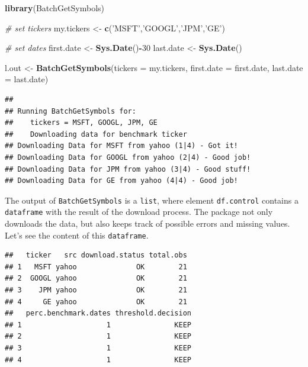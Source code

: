 \documentclass[11pt,]{book}
\newenvironment{Shaded}{\begin{snugshade}}{\end{snugshade}}
\newcommand{\KeywordTok}[1]{\textcolor[rgb]{0.27,0.27,0.27}{\textbf{#1}}}
\newcommand{\DataTypeTok}[1]{\textcolor[rgb]{0.27,0.27,0.27}{#1}}
\newcommand{\DecValTok}[1]{\textcolor[rgb]{0.06,0.06,0.06}{#1}}
\newcommand{\StringTok}[1]{\textcolor[rgb]{0.5,0.5,0.5}{#1}}
\newcommand{\CommentTok}[1]{\textcolor[rgb]{0.56,0.35,0.01}{\textit{#1}}}
\newcommand{\OperatorTok}[1]{\textcolor[rgb]{0.81,0.36,0.00}{\textbf{#1}}}
\newcommand{\NormalTok}[1]{#1}
\begin{document}
\begin{Shaded}
\begin{Highlighting}[]
\KeywordTok{library}\NormalTok{(BatchGetSymbols)}

\CommentTok{# set tickers}
\NormalTok{my.tickers <-}\StringTok{ }\KeywordTok{c}\NormalTok{(}\StringTok{'MSFT'}\NormalTok{,}\StringTok{'GOOGL'}\NormalTok{,}\StringTok{'JPM'}\NormalTok{,}\StringTok{'GE'}\NormalTok{)}

\CommentTok{# set dates}
\NormalTok{first.date <-}\StringTok{ }\KeywordTok{Sys.Date}\NormalTok{()}\OperatorTok{-}\DecValTok{30}
\NormalTok{last.date <-}\StringTok{ }\KeywordTok{Sys.Date}\NormalTok{()}

\NormalTok{l.out <-}\StringTok{ }\KeywordTok{BatchGetSymbols}\NormalTok{(}\DataTypeTok{tickers =}\NormalTok{ my.tickers,}
                         \DataTypeTok{first.date =}\NormalTok{ first.date,}
                         \DataTypeTok{last.date =}\NormalTok{ last.date)}
\end{Highlighting}
\end{Shaded}

\begin{verbatim}
## 
## Running BatchGetSymbols for:
##    tickers = MSFT, GOOGL, JPM, GE
##    Downloading data for benchmark ticker
## Downloading Data for MSFT from yahoo (1|4) - Got it!
## Downloading Data for GOOGL from yahoo (2|4) - Good job!
## Downloading Data for JPM from yahoo (3|4) - Good stuff!
## Downloading Data for GE from yahoo (4|4) - Good job!
\end{verbatim}

The output of \texttt{BatchGetSymbols} is a \texttt{list}, where element
\texttt{df.control} contains a \texttt{dataframe} with the result of the
download process. The package not only downloads the data, but also
keeps track of possible errors and missing values. Let's see the content
of this \texttt{dataframe}.

\begin{Shaded}
\end{Shaded}

\begin{verbatim}
##   ticker   src download.status total.obs
## 1   MSFT yahoo              OK        21
## 2  GOOGL yahoo              OK        21
## 3    JPM yahoo              OK        21
## 4     GE yahoo              OK        21
##   perc.benchmark.dates threshold.decision
## 1                    1               KEEP
## 2                    1               KEEP
## 3                    1               KEEP
## 4                    1               KEEP
\end{verbatim}
\end{document}
